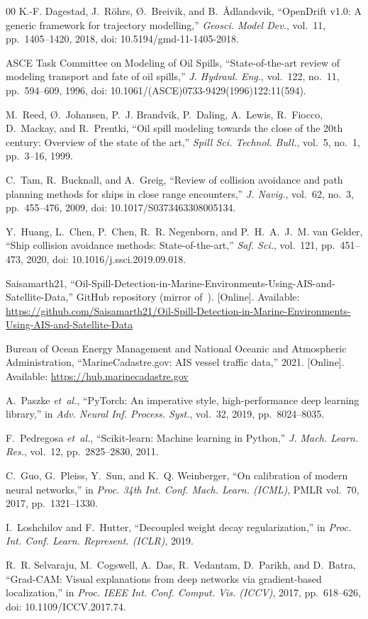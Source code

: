 \documentclass[conference]{IEEEtran}
\begin{document}
\begin{thebibliography}{00}
 K.-F. Dagestad, J.~R\"ohrs, \O.~Breivik, and B.~{\AA}dlandsvik,
``OpenDrift v1.0: A generic framework for trajectory modelling,'' \emph{Geosci. Model
Dev.}, vol.~11, pp.~1405--1420, 2018, doi: 10.5194/gmd-11-1405-2018.

 ASCE Task Committee on Modeling of Oil Spills, ``State-of-the-art
review of modeling transport and fate of oil spills,'' \emph{J. Hydraul. Eng.}, vol.~122,
no.~11, pp.~594--609, 1996, doi: 10.1061/(ASCE)0733-9429(1996)122:11(594).

 M.~Reed, \O.~Johansen, P.~J. Brandvik, P.~Daling, A.~Lewis, R.~Fiocco,
D.~Mackay, and R.~Prentki, ``Oil spill modeling towards the close of the 20th century:
Overview of the state of the art,'' \emph{Spill Sci. Technol. Bull.}, vol.~5, no.~1,
pp.~3--16, 1999.

 C.~Tam, R.~Bucknall, and A.~Greig, ``Review of collision avoidance and
path planning methods for ships in close range encounters,'' \emph{J. Navig.}, vol.~62,
no.~3, pp.~455--476, 2009, doi: 10.1017/S0373463308005134.

 Y.~Huang, L.~Chen, P.~Chen, R.~R. Negenborn, and P.~H.~A.~J.~M. van
Gelder, ``Ship collision avoidance methods: State-of-the-art,'' \emph{Saf. Sci.},
vol.~121, pp.~451--473, 2020, doi: 10.1016/j.ssci.2019.09.018.

 Saisamarth21, ``Oil-Spill-Detection-in-Marine-Environments-Using-AIS-and-Satellite-Data,''
GitHub repository (mirror of~\cite{csiro2022}). [Online]. Available:
\url{https://github.com/Saisamarth21/Oil-Spill-Detection-in-Marine-Environments-Using-AIS-and-Satellite-Data}

 Bureau of Ocean Energy Management and National Oceanic and
Atmospheric Administration, ``MarineCadastre.gov: AIS vessel traffic data,'' 2021.
[Online]. Available: \url{https://hub.marinecadastre.gov}

 A.~Paszke \emph{et~al.}, ``PyTorch: An imperative style,
high-performance deep learning library,'' in \emph{Adv. Neural Inf. Process. Syst.},
vol.~32, 2019, pp.~8024--8035.

 F.~Pedregosa \emph{et~al.}, ``Scikit-learn: Machine learning in
Python,'' \emph{J. Mach. Learn. Res.}, vol.~12, pp.~2825--2830, 2011.

 C.~Guo, G.~Pleiss, Y.~Sun, and K.~Q. Weinberger, ``On calibration of
modern neural networks,'' in \emph{Proc. 34th Int. Conf. Mach. Learn. (ICML)}, PMLR
vol.~70, 2017, pp.~1321--1330.

 I.~Loshchilov and F.~Hutter, ``Decoupled weight decay
regularization,'' in \emph{Proc. Int. Conf. Learn. Represent. (ICLR)}, 2019.

 R.~R. Selvaraju, M.~Cogswell, A.~Das, R.~Vedantam, D.~Parikh, and
D.~Batra, ``Grad-CAM: Visual explanations from deep networks via gradient-based
localization,'' in \emph{Proc. IEEE Int. Conf. Comput. Vis. (ICCV)}, 2017, pp.~618--626,
doi: 10.1109/ICCV.2017.74.
\end{thebibliography}
\end{document}
